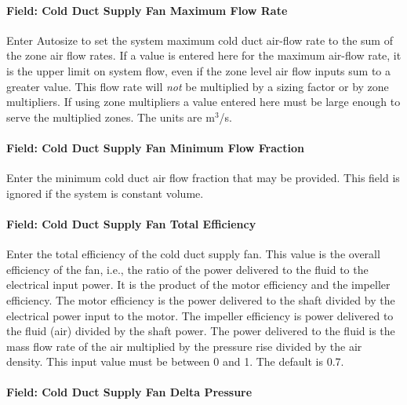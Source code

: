 \paragraph{Field: Cold Duct Supply Fan Maximum Flow Rate}\label{field-cold-duct-supply-fan-maximum-flow-rate}

Enter Autosize to set the system maximum cold duct air-flow rate to the sum of the zone air flow rates. If a value is entered here for the maximum air-flow rate, it is the upper limit on system flow, even if the zone level air flow inputs sum to a greater value. This flow rate will \emph{not} be multiplied by a sizing factor or by zone multipliers. If using zone multipliers a value entered here must be large enough to serve the multiplied zones. The units are m\(^{3}\)/s.

\paragraph{Field: Cold Duct Supply Fan Minimum Flow Fraction}\label{field-cold-duct-supply-fan-minimum-flow-fraction}

Enter the minimum cold duct air flow fraction that may be provided. This field is ignored if the system is constant volume.

\paragraph{Field: Cold Duct Supply Fan Total Efficiency}\label{field-cold-duct-supply-fan-total-efficiency}

Enter the total efficiency of the cold duct supply fan. This value is the overall efficiency of the fan, i.e., the ratio of the power delivered to the fluid to the electrical input power. It is the product of the motor efficiency and the impeller efficiency. The motor efficiency is the power delivered to the shaft divided by the electrical power input to the motor. The impeller efficiency is power delivered to the fluid (air) divided by the shaft power. The power delivered to the fluid is the mass flow rate of the air multiplied by the pressure rise divided by the air density. This input value must be between 0 and 1. The default is 0.7.

\paragraph{Field: Cold Duct Supply Fan Delta Pressure}\label{field-cold-duct-supply-fan-delta-pressure}

